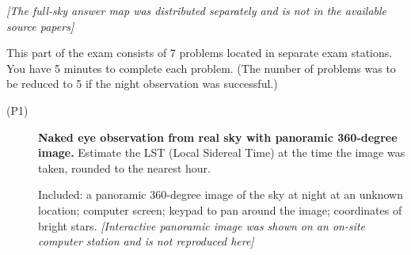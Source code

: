 \textit{[The full-sky answer map was distributed separately and is not in the available source papers]}

This part of the exam consists of 7 problems located in separate exam
stations. You have 5 minutes to complete each problem. (The number of problems
was to be reduced to 5 if the night observation was successful.)

\begin{description}
\item[(P1)] \textbf{Naked eye observation from real sky with panoramic
  360-degree image.} Estimate the LST (Local Sidereal Time) at the time the
  image was taken, rounded to the nearest hour.

  Included: a panoramic 360-degree image of the sky at night at an unknown
  location; computer screen; keypad to pan around the image; coordinates of
  bright stars.
  \textit{[Interactive panoramic image was shown on an on-site computer station and is not reproduced here]}


\end{description}
